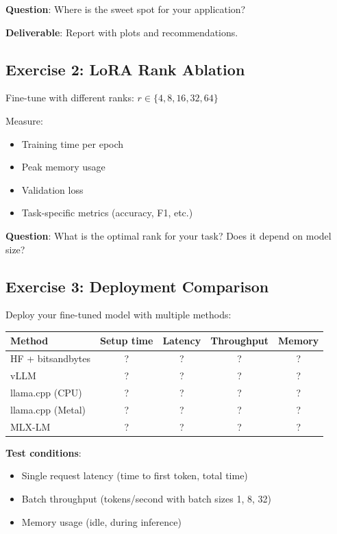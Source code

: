 \documentclass{article}
\begin{document}
\textbf{Question}: Where is the sweet spot for your application?

\textbf{Deliverable}: Report with plots and recommendations.

\subsection{Exercise 2: LoRA Rank Ablation}

Fine-tune with different ranks: $r \in \{4, 8, 16, 32, 64\}$

Measure:
\begin{itemize}
\item Training time per epoch
\item Peak memory usage
\item Validation loss
\item Task-specific metrics (accuracy, F1, etc.)
\end{itemize}

\textbf{Question}: What is the optimal rank for your task? Does it depend on model size?

\subsection{Exercise 3: Deployment Comparison}

Deploy your fine-tuned model with multiple methods:

\begin{center}
\begin{tabular}{lcccc}
\toprule
\textbf{Method} & \textbf{Setup time} & \textbf{Latency} & \textbf{Throughput} & \textbf{Memory} \\
\midrule
HF + bitsandbytes & ? & ? & ? & ? \\
vLLM & ? & ? & ? & ? \\
llama.cpp (CPU) & ? & ? & ? & ? \\
llama.cpp (Metal) & ? & ? & ? & ? \\
MLX-LM & ? & ? & ? & ? \\
\bottomrule
\end{tabular}
\end{center}

\textbf{Test conditions}:
\begin{itemize}
\item Single request latency (time to first token, total time)
\item Batch throughput (tokens/second with batch sizes 1, 8, 32)
\item Memory usage (idle, during inference)
\end{itemize}
\end{document}
